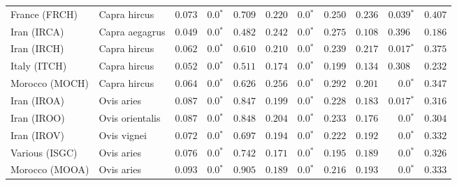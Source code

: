 \documentclass{article}
\begin{document}
\begin{table*}[!ht]
\begin{adjustbox}{width = 1\textwidth}
\begin{tabular}{||l|l||r|r|r||r|r|r||r|r|r||}
                \rowcolor{LIGHTGREY} France (FRCH)                  & Capra hircus        & $ 0.073$ & $\bm{0.0{^*}}$    & $ 0.709$                                                                     & $ 0.220$                      & $\bm{0.0{^*}}$ & $ 0.250$ & $ 0.236$ & $\bm{ 0.039{^*}}$ & $ 0.407$ \\
                \rowcolor{LIGHTGREY} Iran (IRCA)                    & Capra aegagrus      & $ 0.049$ & $\bm{0.0{^*}}$    & $ 0.482$                                                                     & $ 0.242$                      & $\bm{0.0{^*}}$ & $ 0.275$ & $ 0.108$ & $ 0.396~~$ & $ 0.186$ \\
                \rowcolor{LIGHTGREY} Iran (IRCH)                    & Capra hircus        & $ 0.062$ & $\bm{0.0{^*}}$    & $ 0.610$ & $ 0.210$                      & $\bm{0.0{^*}}$ & $ 0.239$ & $ 0.217$ & $\bm{ 0.017{^*}}$ & $ 0.375$ \\
                \rowcolor{LIGHTGREY} Italy (ITCH)                   & Capra hircus        & $ 0.052$ & $\bm{0.0{^*}}$    & $ 0.511$ & $ 0.174$                      & $\bm{0.0{^*}}$ & $ 0.199$ & $ 0.134$ & $ 0.308~~$ & $ 0.232$ \\
                \rowcolor{LIGHTGREY} Morocco (MOCH)                 & Capra hircus        & $ 0.064$ & $\bm{0.0{^*}}$    & $ 0.626$                                                                     & $ 0.256$                      & $\bm{0.0{^*}}$ & $ 0.292$ & $ 0.201$ & $\bm{0.0{^*}}$ & $ 0.347$ \\
                Iran (IROA)                                         & Ovis aries          & $ 0.087$ & $\bm{0.0{^*}}$    & $ 0.847$ & $ 0.199$ & $\bm{0.0{^*}}$ & $ 0.228$ & $ 0.183$ & $\bm{ 0.017{^*}}$ & $ 0.316$ \\
                Iran (IROO)                                         & Ovis orientalis     & $ 0.087$ & $\bm{0.0{^*}}$    & $ 0.848$ & $ 0.204$ & $\bm{0.0{^*}}$ & $ 0.233$ & $ 0.176$ & $\bm{0.0{^*}}$ & $ 0.304$ \\
                Iran (IROV)                                         & Ovis vignei         & $ 0.072$ & $\bm{0.0{^*}}$    & $ 0.697$ & $ 0.194$ & $\bm{0.0{^*}}$ & $ 0.222$ & $ 0.192$ & $\bm{0.0{^*}}$ & $ 0.332$ \\
                Various (ISGC)                                      & Ovis aries          & $ 0.076$ & $\bm{0.0{^*}}$    & $ 0.742$ & $ 0.171$ & $\bm{0.0{^*}}$ & $ 0.195$ & $ 0.189$ & $\bm{0.0{^*}}$ & $ 0.326$ \\
                Morocco (MOOA)                                      & Ovis aries          & $ 0.093$ & $\bm{0.0{^*}}$    & $ 0.905$ & $ 0.189$ & $\bm{0.0{^*}}$ & $ 0.216$ & $ 0.193$ & $\bm{0.0{^*}}$ & $ 0.333$ \\

\end{tabular}
\end{adjustbox}
\end{table*}
\end{document}
